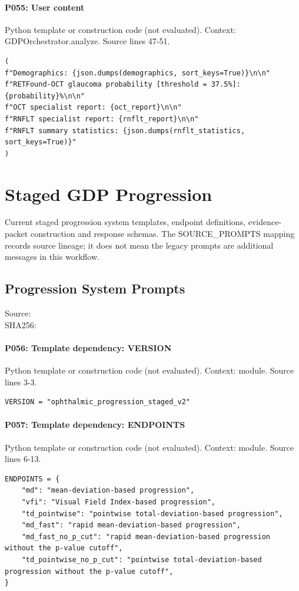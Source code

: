 \documentclass[10pt]{article}
\begin{document}
\paragraph{P055: User content}
Python template or construction code (not evaluated). Context: GDPOrchestrator.analyze. Source lines 47-51.
\begin{Verbatim}
(
f"Demographics: {json.dumps(demographics, sort_keys=True)}\n\n"
f"RETFound-OCT glaucoma probability [threshold = 37.5%]: {probability}%\n\n"
f"OCT specialist report: {oct_report}\n\n"
f"RNFLT specialist report: {rnflt_report}\n\n"
f"RNFLT summary statistics: {json.dumps(rnflt_statistics, sort_keys=True)}"
)
\end{Verbatim}
\clearpage
\section{Staged GDP Progression}
Current staged progression system templates, endpoint definitions, evidence-packet construction and response schemas. The SOURCE\_PROMPTS mapping records source lineage; it does not mean the legacy prompts are additional messages in this workflow.
\subsection{Progression System Prompts}
Source: \\
SHA256: {\scriptsize{}}
\paragraph{P056: Template dependency: VERSION}
Python template or construction code (not evaluated). Context: module. Source lines 3-3.
\begin{Verbatim}
VERSION = "ophthalmic_progression_staged_v2"
\end{Verbatim}
\paragraph{P057: Template dependency: ENDPOINTS}
Python template or construction code (not evaluated). Context: module. Source lines 6-13.
\begin{Verbatim}
ENDPOINTS = {
    "md": "mean-deviation-based progression",
    "vfi": "Visual Field Index-based progression",
    "td_pointwise": "pointwise total-deviation-based progression",
    "md_fast": "rapid mean-deviation-based progression",
    "md_fast_no_p_cut": "rapid mean-deviation-based progression without the p-value cutoff",
    "td_pointwise_no_p_cut": "pointwise total-deviation-based progression without the p-value cutoff",
}
\end{Verbatim}
\end{document}
